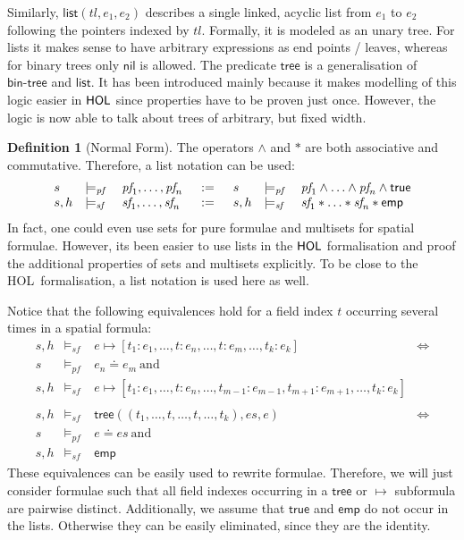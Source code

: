 \documentclass{scrartcl}
\theoremstyle{definition}
\newtheorem{definition}{Definition}
\newcommand{\HOL}{{\sf HOL}}
\newcommand{\nil}{{\textsf{nil}}}
\newcommand{\pftrue}{{\textsf{true}}}
\newcommand{\pfequal}[2]{\ensuremath{#1 \doteq #2}}
\newcommand{\modelspf}{{\models_{\textit{pf}}\ }}
\newcommand{\modelssf}{{\models_{\textit{sf}}\ }}
\newcommand{\sfemp}{{\textsf{emp}}}
\newcommand{\sftree}{{\textsf{tree}}}
\newcommand{\sfpointsto}[2]{#1 \mapsto [#2]}
\newcommand{\sfbintree}{{\textsf{bin-tree}}}
\newcommand{\sflist}{{\textsf{list}}}
\newcommand{\varpf}[1]{\textit{pf}_{#1}}
\newcommand{\varsf}[1]{\textit{sf}_{#1}}
\begin{document}
Similarly, $\sflist (tl, e_1, e_2)$ describes a single linked, acyclic list
from $e_1$ to $e_2$ following the pointers indexed by $tl$. Formally, it is
modeled as an unary tree. For lists it makes
sense to have arbitrary expressions as end points / leaves, whereas for binary
trees only $\nil$ is allowed. The predicate $\sftree$ is a generalisation of
$\sfbintree$ and $\sflist$. It has been introduced mainly because it makes
modelling of this logic easier in $\HOL$ since properties have to be proven
just once. However, the logic is now able to talk about trees of arbitrary, but
fixed width.
\bigskip

\begin{definition}[Normal Form]
The operators $\wedge$ and $*$ are both associative and
commutative. Therefore, a list notation can be used:
%
\setlength{\arraycolsep}{2pt}
\[
\begin{array}{lll@{\hspace{15pt}}c@{\hspace{15pt}}lll}
   s & \modelspf & \varpf 1, \ldots, \varpf n & := & s & \modelspf & \varpf 1 \wedge \ldots \wedge
   \varpf n \wedge \pftrue \\
   s, h & \modelssf & \varsf 1, \ldots, \varsf n & := & s, h & \modelssf & \varsf 1 * \ldots *
   \varsf n * \sfemp
\end{array}
\]
%
In fact, one could even use sets for pure formulae and multisets for spatial
formulae. However, its been easier to use lists in the $\HOL$ formalisation
and proof the additional properties of sets and multisets explicitly.
To be close to the \HOL\ formalisation, a list notation is used here as well.

Notice that the following equivalences hold for a field index $t$
occurring several times in a spatial formula:
%
\[
\begin{array}{lllr}
s, h & \modelssf & \sfpointsto e {t_1:e_1, \ldots, t: e_n, \ldots, t:
  e_m, \ldots, t_k : e_k} & \Longleftrightarrow \\
s & \modelspf & \pfequal {e_n} {e_m}\ \text{and} \\
s, h & \modelssf & \sfpointsto e {t_1:e_1, \ldots, t: e_n, \ldots, t_{m-1}:
  e_{m-1}, t_{m+1}: e_{m+1}, \ldots, t_k : e_k} \\ \\

s, h & \modelssf & \sftree \left((t_1, \ldots, t, \ldots, t, \ldots,
  t_k),\textit{es},e\right) & \Longleftrightarrow \\
s & \modelspf & \pfequal {e} {\textit{es}}\ \text{and} \\
s, h & \modelssf & \sfemp
\end{array}
\]
%
These equivalences can be easily used to rewrite formulae. Therefore, we will
just consider formulae such that all field indexes occurring in a $\sftree$ or
$\mapsto$ subformula are pairwise distinct. Additionally, we assume that
$\pftrue$ and $\sfemp$ do not occur in the lists. Otherwise they can be easily
eliminated, since they are the identity.


\end{definition}
\end{document}
